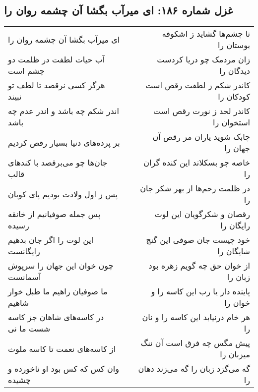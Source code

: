 \begin{center}
\section*{غزل شماره ۱۸۶: ای میرآب بگشا آن چشمه روان را}
\label{sec:0186}
\begin{longtable}{l p{0.5cm} r}
ای میرآب بگشا آن چشمه روان را
&&
تا چشم‌ها گشاید ز اشکوفه بوستان را
\\
آب حیات لطفت در ظلمت دو چشم است
&&
زان مردمک چو دریا کردست دیدگان را
\\
هرگز کسی نرقصد تا لطف تو نبیند
&&
کاندر شکم ز لطفت رقص است کودکان را
\\
اندر شکم چه باشد و اندر عدم چه باشد
&&
کاندر لحد ز نورت رقص است استخوان را
\\
بر پرده‌های دنیا بسیار رقص کردیم
&&
چابک شوید یاران مر رقص آن جهان را
\\
جان‌ها چو می‌برقصد با کندهای قالب
&&
خاصه چو بسکلاند این کنده گران را
\\
پس ز اول ولادت بودیم پای کوبان
&&
در ظلمت رحم‌ها از بهر شکر جان را
\\
پس جمله صوفیانیم از خانقه رسیده
&&
رقصان و شکرگویان این لوت رایگان را
\\
این لوت را اگر جان بدهیم رایگانست
&&
خود چیست جان صوفی این گنج شایگان را
\\
چون خوان این جهان را سرپوش آسمانست
&&
از خوان حق چه گویم زهره بود زبان را
\\
ما صوفیان راهیم ما طبل خوار شاهیم
&&
پاینده دار یا رب این کاسه را و خوان را
\\
در کاسه‌های شاهان جز کاسه شست ما نی
&&
هر خام درنیابد این کاسه را و نان را
\\
از کاسه‌های نعمت تا کاسه ملوث
&&
پیش مگس چه فرق است آن ننگ میزبان را
\\
وان کس که کس بود او ناخورده و چشیده
&&
گه می‌گزد زبان را گه می‌زند دهان را
\\
\end{longtable}
\end{center}
